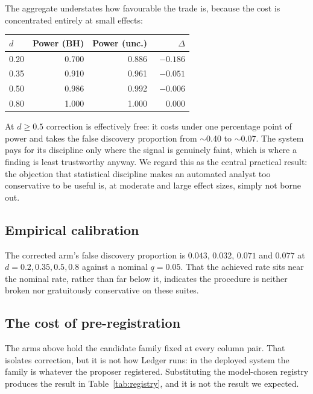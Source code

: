 \documentclass[10pt,twocolumn]{article}
\begin{document}
The aggregate understates how favourable the trade is, because the cost is
concentrated entirely at small effects:

\begin{center}\small
\begin{tabular}{@{}lrrr@{}}
\toprule
$d$ & Power (BH) & Power (unc.) & $\Delta$ \\
\midrule
0.20 & 0.700 & 0.886 & $-0.186$ \\
0.35 & 0.910 & 0.961 & $-0.051$ \\
0.50 & 0.986 & 0.992 & $-0.006$ \\
0.80 & 1.000 & 1.000 & $\phantom{-}0.000$ \\
\bottomrule
\end{tabular}
\end{center}

\noindent
At $d \geq 0.5$ correction is effectively free: it costs under one percentage
point of power and takes the false discovery proportion from $\sim$0.40 to
$\sim$0.07. The system pays for its discipline only where the signal is
genuinely faint, which is where a finding is least trustworthy anyway. We regard
this as the central practical result: the objection that statistical discipline
makes an automated analyst too conservative to be useful is, at moderate and
large effect sizes, simply not borne out.

\subsection{Empirical calibration}

The corrected arm's false discovery proportion is $0.043$, $0.032$, $0.071$ and
$0.077$ at $d = 0.2, 0.35, 0.5, 0.8$ against a nominal $q = 0.05$. That the
achieved rate sits near the nominal rate, rather than far below it, indicates
the procedure is neither broken nor gratuitously conservative on these suites.

\subsection{The cost of pre-registration}
\label{sec:coverage}

The arms above hold the candidate family fixed at every column pair. That
isolates correction, but it is not how Ledger runs: in the deployed system the
family is whatever the proposer registered. Substituting the model-chosen
registry produces the result in Table~\ref{tab:registry}, and it is not the
result we expected.
\end{document}
